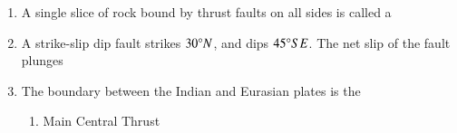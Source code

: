 \documentclass[12pt,fleqn]{article}
\theoremstyle{remark}
\begin{document}
\begin{enumerate}[label=Q.\arabic*.]
\begin{multicols}{2}
        \end{multicols}
            \begin {enumerate}
            \end{enumerate}
    \item A single slice of rock bound by thrust faults on all sides is called a \hfill{} 
        \begin {enumerate}
            \end{enumerate}
    \item A strike-slip dip fault strikes $30\degree N$, and dips $45\degree SE$. The net slip of the fault plunges \hfill{} 
        \begin {enumerate}
            \end{enumerate}
    \item The boundary between the Indian and Eurasian plates is the \hfill{} 
        \begin{enumerate}
                \item Main Central Thrust

\end{enumerate}
\end{enumerate}
\end{document}
